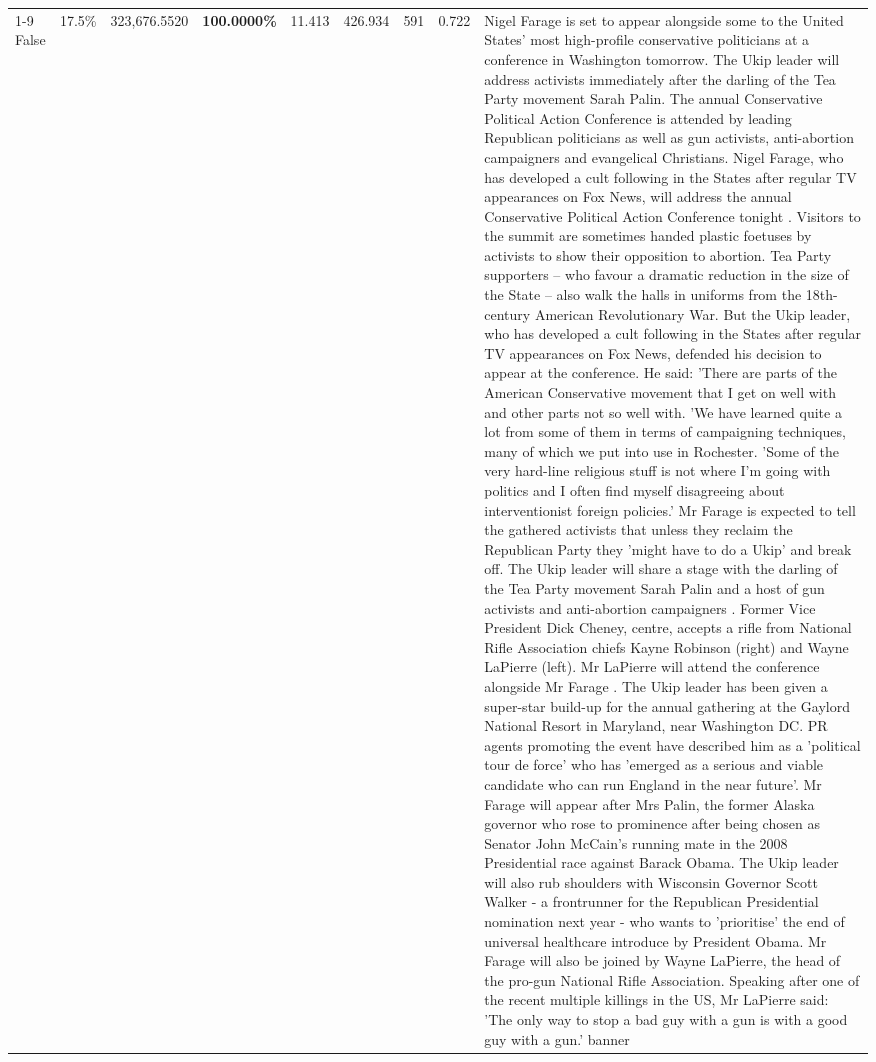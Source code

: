 \begin{table}[H]
\begin{tabular}{lllrlllll}
\cline{1-9}
False & 17.5\% & 323,676.5520 & \bfseries \color{red} 100.0000\% & 11.413 & 426.934 & 591 & 0.722 & Nigel Farage is set to appear alongside some to the United States' most high-profile conservative politicians at a conference in Washington tomorrow. The Ukip leader will address activists immediately after the darling of the Tea Party movement Sarah Palin. The annual Conservative Political Action Conference is attended by leading Republican politicians as well as gun activists, anti-abortion campaigners and evangelical Christians. Nigel Farage, who has developed a cult following in the States after regular TV appearances on Fox News, will address the annual Conservative Political Action Conference tonight . Visitors to the summit are sometimes handed plastic foetuses by activists to show their opposition to abortion. Tea Party supporters – who favour a dramatic reduction in the size of the State – also walk the halls in uniforms from the 18th-century American Revolutionary War. But the Ukip leader, who has developed a cult following in the States after regular TV appearances on Fox News, defended his decision to appear at the conference. He said: 'There are parts of the American Conservative movement that I get on well with and other parts not so well with. 'We have learned quite a lot from some of them in terms of campaigning techniques, many of which we put into use in Rochester. 'Some of the very hard-line religious stuff is not where I'm going with politics and I often find myself disagreeing about interventionist foreign policies.' Mr Farage is expected to tell the gathered activists that unless they reclaim the Republican Party they 'might have to do a Ukip' and break off. The Ukip leader will share a stage with the darling of the Tea Party movement Sarah Palin and a host of gun activists and anti-abortion campaigners . Former Vice President Dick Cheney, centre, accepts a rifle from National Rifle Association chiefs Kayne Robinson (right) and Wayne LaPierre (left). Mr LaPierre will attend the conference alongside Mr Farage . The Ukip leader has been given a super-star build-up for the annual gathering at the Gaylord National Resort in Maryland, near Washington DC. PR agents promoting the event have described him as a 'political tour de force' who has 'emerged as a serious and viable candidate who can run England in the near future'. Mr Farage will appear after Mrs Palin, the former Alaska governor who rose to prominence after being chosen as Senator John McCain's running mate in the 2008 Presidential race against Barack Obama. The Ukip leader will also rub shoulders with Wisconsin Governor Scott Walker - a frontrunner for the Republican Presidential nomination next year - who wants to 'prioritise' the end of universal healthcare introduce by President Obama. Mr Farage will also be joined by Wayne LaPierre, the head of the pro-gun National Rifle Association. Speaking after one of the recent multiple killings in the US, Mr LaPierre said: 'The only way to stop a bad guy with a gun is with a good guy with a gun.' banner \\

\end{tabular}
\end{table}
